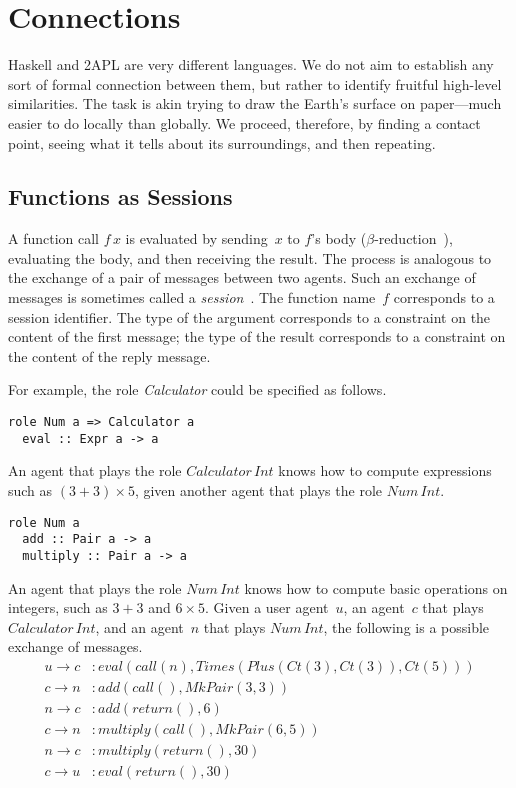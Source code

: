 \documentclass[conference,compsoc]{IEEEtran} %
\begin{document}
\section{Connections} %

Haskell and 2APL are very different languages. We do not aim to establish
any sort of formal connection between them, but rather to identify fruitful
high-level similarities. The task is akin trying to draw the Earth's
surface on paper---much easier to do locally than globally. We proceed,
therefore, by finding a contact point, seeing what it tells about its
surroundings, and then repeating.

\subsection{Functions as Sessions} %

A function call $f\,x$ is evaluated by sending~$x$ to $f$'s body
($\beta$-reduction~\cite[Chapter~5]{DBLP:books/daglib/0005958}), evaluating
the body, and then receiving the result. The process is analogous to the
exchange of a pair of messages between two agents. Such an exchange of
messages is sometimes called a
\emph{session}~\cite{DBLP:conf/parle/TakeuchiHK94}. The function name~$f$
corresponds to a session identifier. The type of the argument corresponds
to a constraint on the content of the first message; the type of the result
corresponds to a constraint on the content of the reply message.

For example, the role \textit{Calculator} could be specified as follows.
\begin{lstlisting}[style=me]
role Num a => Calculator a
  eval :: Expr a -> a
\end{lstlisting}
An agent that plays the role $\mathit{Calculator}\,\mathit{Int}$ knows
how to compute expressions such as $(3+3)\times5$, given another agent
that plays the role $\mathit{Num}\,\mathit{Int}$.
\begin{lstlisting}[style=me]
role Num a
  add :: Pair a -> a
  multiply :: Pair a -> a
\end{lstlisting}
An agent that plays the role $\mathit{Num}\,\mathit{Int}$ knows how to
compute basic operations on integers, such as $3+3$ and $6\times5$. Given a
user agent~$u$, an agent~$c$ that plays
$\mathit{Calculator}\,\mathit{Int}$, and an agent~$n$ that plays
$\mathit{Num}\,\mathit{Int}$, the following is a possible exchange of
messages.
\begin{align*}
u\to c &: 
  \mathit{eval}(\mathit{call}(n),\mathit{Times}(
    \mathit{Plus}(\mathit{Ct}(3),\mathit{Ct}(3)),\mathit{Ct}(5)))\\
c\to n &: \mathit{add}(\mathit{call}(), \mathit{MkPair}(3, 3))\\
n\to c &: \mathit{add}(\mathit{return}(), 6)\\
c\to n &: \mathit{multiply}(\mathit{call}(), \mathit{MkPair}(6, 5))\\
n\to c &: \mathit{multiply}(\mathit{return}(), 30)\\
c\to u &: \mathit{eval}(\mathit{return}(), 30)
\end{align*}
\end{document}
